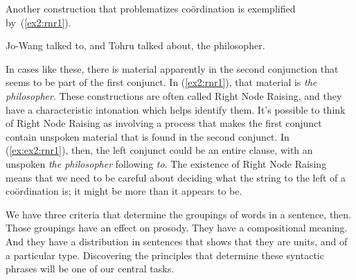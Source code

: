 Another construction that problematizes co\"ordination is exemplified by~(\ref{ex2:rnr1}).
\begin{exe}
	\raggedright
	\ex \label{ex2:rnr1} Jo-Wang talked to, and Tohru talked about, the philosopher.
\end{exe}
In cases like these, there is material apparently in the second conjunction that seems to be part of the first conjunct. In (\ref{ex2:rnr1}), that material is \emph{the philosopher}. These constructions are often called Right Node Raising, and they have a characteristic intonation which helps identify them.%
%
%
%
It's possible to think of Right Node Raising as involving a process that makes the first conjunct contain unspoken material that is found in the second conjunct. In (\ref{ex:ex2:rnr1}), then, the left conjunct could be an entire clause, with an unspoken \textit{the philosopher} following \textit{to}. The existence of Right Node Raising means that we need to be careful about deciding what the string to the left of a co\"ordination is; it might be more than it appears to be. 

We have three criteria that determine the groupings of words in a sentence, then. Those groupings have an effect on prosody. They have a compositional meaning. And they have a distribution in sentences that shows that they are units, and of a particular type. Discovering the principles that determine these syntactic phrases will be one of our central tasks.

